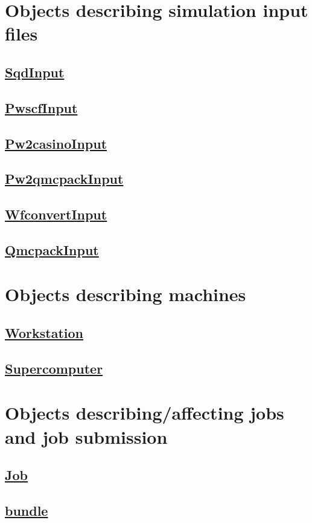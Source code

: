 \documentclass[oneside,11pt]{memoir}
\numberwithin{equation}{section}
\newcommand{\bu}[1]{\textbf{\underline{#1}}}
\begin{document}
\section{Objects describing simulation input files}
\subsection{\bu{SqdInput}}
\subsection{\bu{PwscfInput}}
\subsection{\bu{Pw2casinoInput}}
\subsection{\bu{Pw2qmcpackInput}}
\subsection{\bu{WfconvertInput}}
\subsection{\bu{QmcpackInput}}


\section{Objects describing machines}
\subsection{\bu{Workstation}}
\subsection{\bu{Supercomputer} }


\section{Objects describing/affecting jobs and job submission}
\subsection{\bu{Job}}
\subsection{\bu{bundle}}
\end{document}
